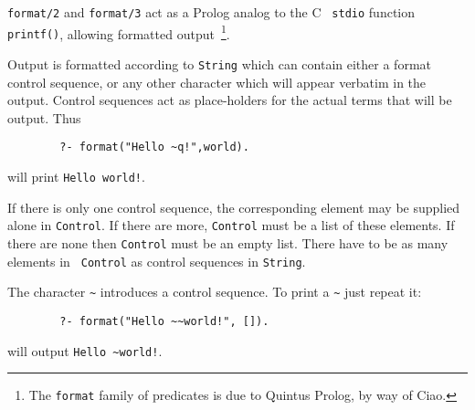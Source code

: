 \begin{description}

{\tt format/2} and {\tt format/3} act as a Prolog analog to the C {\tt
stdio} function {\tt printf()}, allowing formatted
output~\footnote{The {\tt format} family of predicates is due to
Quintus Prolog, by way of Ciao.}.

Output is formatted according to {\tt String} which can contain either
a format control sequence, or any other character which will appear
verbatim in the output. Control sequences act as place-holders for the
actual terms that will be output.  Thus
\begin{verbatim}
        ?- format("Hello ~q!",world).
\end{verbatim}

\noindent
will print {\tt Hello world!}.

If there is only one control sequence, the corresponding element may
be supplied alone in {\tt Control}.  If there are more, {\tt Control}
must be a list of these elements. If there are none then {\tt Control}
must be an empty list. There have to be as many elements in {\tt
Control} as control sequences in {\tt String}.

The character \verb|~| introduces a control sequence. To print 
        a \verb|~| just repeat it:  
        \begin{verbatim}
        ?- format("Hello ~~world!", []).
        \end{verbatim}
      \noindent
        will output  \verb|Hello ~world!|.



\end{description}
